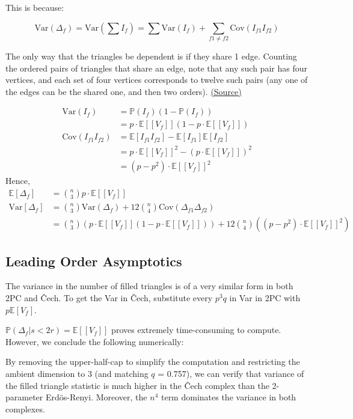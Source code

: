 \documentclass[11pt]{article}
\theoremstyle{definition}
\renewcommand{\P}{\mathbb{P}} %
\newcommand{\E}{\mathbb{E}}
\begin{document}
This is because:

$$
\mathrm{Var}(\Delta_{f})=\mathrm{Var}\left(\sum I_{f}\right)=\sum \mathrm{Var}\left(I_{f}\right)+\sum_{f1 \neq f2} \mathrm{Cov}\left(I_{f1} I_{f2}\right)
$$

The only way that the triangles be dependent is if they share 1 edge. Counting the ordered pairs of triangles that share an edge, note that any such pair has four vertices, and each set of four vertices corresponds to twelve such pairs (any one of the edges can be the shared one, and then two orders). \hyperlink{https://math.stackexchange.com/questions/2736641/variance-in-the-number-of-triangles-in-a-random-graph-of-size-n}{(Source)}

$$
\begin{aligned}
\mathrm{Var}\left( I_{f}\right) &= \P(I_{f}) (1-\P(I_{f})) \\
&= p \cdot \E[[V_f]] (1-p \cdot \E[[V_f]]) \\
\mathrm{Cov}(I_{f1}I_{f2}) &= \E[I_{f1}I_{f2}] - \E[I_{f1}]\E[I_{f2}]  \\
&= p \cdot \E[[V_f]]^2 - (p \cdot \E[[V_f]])^2 \\
&= (p-p^2) \cdot \E[[V_f]]^2
\end{aligned}
$$
Hence,
$$
\begin{aligned}
\E[\Delta_f]&= {n \choose 3} p \cdot \E[[V_f]]  \\
\mathrm{Var}[\Delta_f] &= {n \choose 3} \mathrm{Var}(\Delta_f) + 12 {n \choose 4} \mathrm{Cov}(\Delta_{f1}\Delta_{f2}) \\
&= {n \choose 3} \left( p \cdot \E[[V_f]] (1-p \cdot \E[[V_f]])\right) + 12 {n \choose 4} \left( (p-p^2) \cdot \E[[V_f]]^2 \right)
\end{aligned}
$$

\subsection{Leading Order Asymptotics}

The variance in the number of filled triangles is of a very similar form in both 2PC and Čech. To get the Var in Čech, substitute every $p^3q$ in Var in 2PC with $p \E[V_f]$.

$\P(\Delta_f | s<2r) = \E[[V_f]]$ proves extremely time-consuming to compute. However, we conclude the following numerically:

By removing the upper-half-cap to simplify the computation and restricting the ambient dimension to 3 (and matching $q$ = 0.757), we can verify that variance of the filled triangle statistic is much higher in the Čech complex than the 2-parameter Erdös-Renyi. Moreover, the $n^4$ term dominates the variance in both complexes. 
\end{document}
